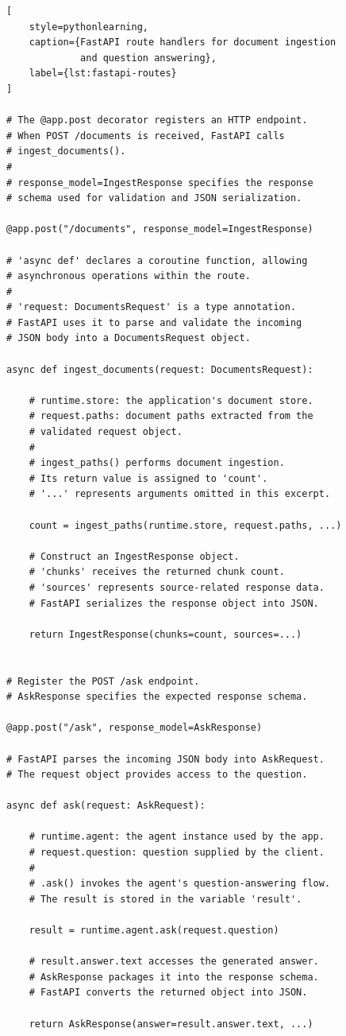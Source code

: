\begin{lstlisting}[
    style=pythonlearning,
    caption={FastAPI route handlers for document ingestion
             and question answering},
    label={lst:fastapi-routes}
]

# The @app.post decorator registers an HTTP endpoint.
# When POST /documents is received, FastAPI calls
# ingest_documents().
#
# response_model=IngestResponse specifies the response
# schema used for validation and JSON serialization.

@app.post("/documents", response_model=IngestResponse)

# 'async def' declares a coroutine function, allowing
# asynchronous operations within the route.
#
# 'request: DocumentsRequest' is a type annotation.
# FastAPI uses it to parse and validate the incoming
# JSON body into a DocumentsRequest object.

async def ingest_documents(request: DocumentsRequest):

    # runtime.store: the application's document store.
    # request.paths: document paths extracted from the
    # validated request object.
    #
    # ingest_paths() performs document ingestion.
    # Its return value is assigned to 'count'.
    # '...' represents arguments omitted in this excerpt.

    count = ingest_paths(runtime.store, request.paths, ...)

    # Construct an IngestResponse object.
    # 'chunks' receives the returned chunk count.
    # 'sources' represents source-related response data.
    # FastAPI serializes the response object into JSON.

    return IngestResponse(chunks=count, sources=...)


# Register the POST /ask endpoint.
# AskResponse specifies the expected response schema.

@app.post("/ask", response_model=AskResponse)

# FastAPI parses the incoming JSON body into AskRequest.
# The request object provides access to the question.

async def ask(request: AskRequest):

    # runtime.agent: the agent instance used by the app.
    # request.question: question supplied by the client.
    #
    # .ask() invokes the agent's question-answering flow.
    # The result is stored in the variable 'result'.

    result = runtime.agent.ask(request.question)

    # result.answer.text accesses the generated answer.
    # AskResponse packages it into the response schema.
    # FastAPI converts the returned object into JSON.

    return AskResponse(answer=result.answer.text, ...)

\end{lstlisting}

